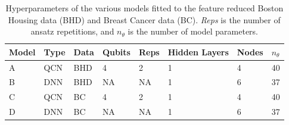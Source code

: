 \begin{table}[H]
\centering
\caption{Hyperparameters of the various models fitted to the feature reduced Boston Housing data (BHD) and Breast Cancer data (BC). \emph{Reps} is the number of ansatz repetitions, and $n_{\theta}$ is the number of model parameters.} 
\begin{tabular}{|l|l|l|l|l|l|l|l|}
\hline
Model& Type& Data& Qubits& Reps& Hidden Layers & Nodes &$n_{\theta}$ \\ \hline
A    & QCN & BHD  & 4     & 2  &1     & 4& 40   \\ \hline
B    & DNN & BHD  & NA    & NA &1     & 6& 37 \\ \Xhline{2\arrayrulewidth}
C    & QCN & BC        & 4     & 2  &1     & 4& 40  \\ \hline
D    & DNN & BC        & NA    & NA &1     & 6& 37  \\ \hline
\end{tabular}

\label{tab:training models PCA}
\end{table}

